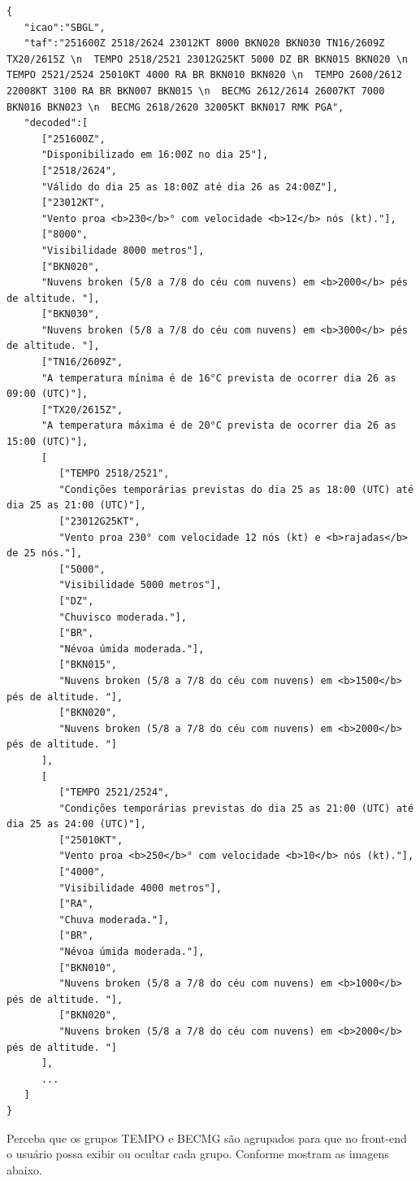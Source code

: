 \begin{smaller}
\begin{verbatim}
{
   "icao":"SBGL",
   "taf":"251600Z 2518/2624 23012KT 8000 BKN020 BKN030 TN16/2609Z TX20/2615Z \n  TEMPO 2518/2521 23012G25KT 5000 DZ BR BKN015 BKN020 \n  TEMPO 2521/2524 25010KT 4000 RA BR BKN010 BKN020 \n  TEMPO 2600/2612 22008KT 3100 RA BR BKN007 BKN015 \n  BECMG 2612/2614 26007KT 7000 BKN016 BKN023 \n  BECMG 2618/2620 32005KT BKN017 RMK PGA",
   "decoded":[
      ["251600Z",
      "Disponibilizado em 16:00Z no dia 25"],
      ["2518/2624",
      "Válido do dia 25 as 18:00Z até dia 26 as 24:00Z"],
      ["23012KT",
      "Vento proa <b>230</b>° com velocidade <b>12</b> nós (kt)."],
      ["8000",
      "Visibilidade 8000 metros"],
      ["BKN020",
      "Nuvens broken (5/8 a 7/8 do céu com nuvens) em <b>2000</b> pés de altitude. "],
      ["BKN030",
      "Nuvens broken (5/8 a 7/8 do céu com nuvens) em <b>3000</b> pés de altitude. "],
      ["TN16/2609Z",
      "A temperatura mínima é de 16°C prevista de ocorrer dia 26 as 09:00 (UTC)"],
      ["TX20/2615Z",
      "A temperatura máxima é de 20°C prevista de ocorrer dia 26 as 15:00 (UTC)"],
      [
         ["TEMPO 2518/2521",
         "Condições temporárias previstas do dia 25 as 18:00 (UTC) até dia 25 as 21:00 (UTC)"],
         ["23012G25KT",
         "Vento proa 230° com velocidade 12 nós (kt) e <b>rajadas</b> de 25 nós."],
         ["5000",
         "Visibilidade 5000 metros"],
         ["DZ",
         "Chuvisco moderada."],
         ["BR",
         "Névoa úmida moderada."],
         ["BKN015",
         "Nuvens broken (5/8 a 7/8 do céu com nuvens) em <b>1500</b> pés de altitude. "],
         ["BKN020",
         "Nuvens broken (5/8 a 7/8 do céu com nuvens) em <b>2000</b> pés de altitude. "]
      ],
      [
         ["TEMPO 2521/2524",
         "Condições temporárias previstas do dia 25 as 21:00 (UTC) até dia 25 as 24:00 (UTC)"],
         ["25010KT",
         "Vento proa <b>250</b>° com velocidade <b>10</b> nós (kt)."],
         ["4000",
         "Visibilidade 4000 metros"],
         ["RA",
         "Chuva moderada."],
         ["BR",
         "Névoa úmida moderada."],
         ["BKN010",
         "Nuvens broken (5/8 a 7/8 do céu com nuvens) em <b>1000</b> pés de altitude. "],
         ["BKN020",
         "Nuvens broken (5/8 a 7/8 do céu com nuvens) em <b>2000</b> pés de altitude. "]
      ],
      ...
   ]
}
\end{verbatim}
\end{smaller}

Perceba que os grupos TEMPO e BECMG são
agrupados para que no front-end o usuário possa exibir ou ocultar cada grupo. Conforme mostram
as imagens abaixo.

